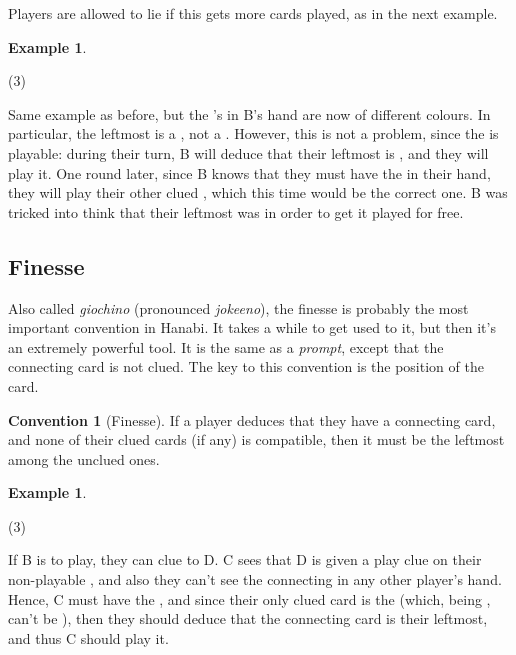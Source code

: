 \documentclass[a4paper]{article}
\theoremstyle{plain}
\theoremstyle{definition}
\newtheorem{example}[theorem]{Example}
\newtheorem{convention}[theorem]{Convention}
\begin{document}
Players are allowed to lie if this gets more cards played, as in the next example.

\begin{example}
	\hfill
	\begin{tasks}(3)
		\task[+]      
		\task[A]    
		\task[B]    
		\task[C]    
		\task[D]    
		\task[E]    
	\end{tasks}
	
	Same example as before, but the 's in B's hand are now of different colours. In particular, the leftmost is a , not a . However, this is not a problem, since the  is playable: during their turn, B will deduce that their leftmost  is , and they will play it. One round later, since B knows that they must have the  in their hand, they will play their other clued , which this time would be the correct one. B was tricked into think that their leftmost  was  in order to get it played for free.
\end{example}

\subsection{Finesse}
\label{sec:finesse}

Also called \textit{giochino} (pronounced \textit{jokeeno}), the finesse is probably the most important convention in Hanabi. It takes a while to get used to it, but then it's an extremely powerful tool. It is the same as a \textit{prompt}, except that the connecting card is not clued. The key to this convention is the position of the card.

\begin{convention}[Finesse]
	\label{finesse}
	If a player deduces that they have a connecting card, and none of their clued cards (if any) is compatible, then it must be the leftmost among the unclued ones.
\end{convention}

\begin{example}
	\hfill
	\begin{tasks}(3)
		\task[+]      
		\task[A]    
		\task[B]    
		\task[C]    
		\task[D]    
		\task[E]    
	\end{tasks}
	
	If B is to play, they can clue  to D. C sees that D is given a play clue on their non-playable , and also they can't see the connecting  in any other player's hand. Hence, C must have the , and since their only clued card is the  (which, being , can't be ), then they should deduce that the connecting card is their leftmost, and thus C should play it.
\end{example}
\end{document}

